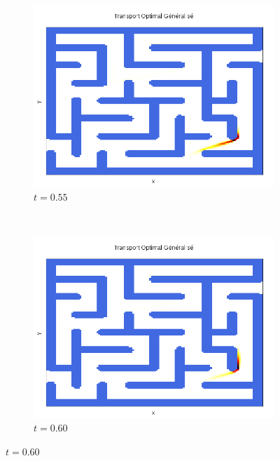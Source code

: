 \documentclass[a4paper,12pt]{article}
\begin{document}
\begin{figure}[!h]
\begin{subfigure}[b]{0.23\linewidth}
\includegraphics[width=\linewidth]{img/2DLabyrinthe/T_00056.png}
\caption*{$t=0.55$}
\end{subfigure}
~
\begin{subfigure}[b]{0.23\linewidth}
\includegraphics[width=\linewidth]{img/2DLabyrinthe/T_00061.png}
\caption*{$t=0.60$}
\end{subfigure}


\end{figure}
\end{document}
